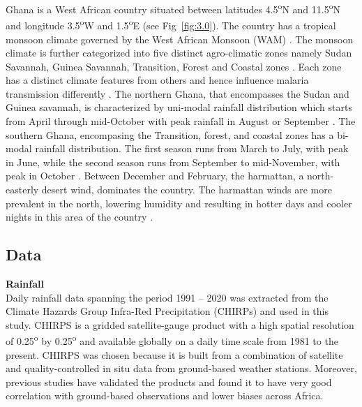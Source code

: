 \documentclass[utf8]{FrontiersinHarvard} %
\begin{document}
Ghana is a West African country situated between latitudes 4.5\textsuperscript{o}N and 11.5\textsuperscript{o}N and longitude 3.5\textsuperscript{o}W and 1.5\textsuperscript{o}E (see Fig~\ref{fig:3.0}). The country has a tropical monsoon climate governed by the West African Monsoon (WAM) \citep{ansah2020meteorological,aryee2018development}. The monsoon climate is further categorized into five distinct agro-climatic zones namely Sudan Savannah, Guinea Savannah, Transition, Forest and Coastal zones \citep{yamba2023revisiting}. Each zone has a distinct climate features from others and hence influence malaria transmission differently \citep{yamba2023climate}. The northern Ghana, that encompasses the Sudan and Guinea savannah, is characterized by uni-modal rainfall distribution which starts from April through mid-October with peak rainfall in August or September \citep{yamba2023revisiting}. The southern Ghana, encompasing the Transition, forest, and coastal zones has a bi-modal rainfall distribution. The first season runs from March to July, with peak in June, while the second season runs from September to mid-November, with peak in October \citep{yamba2023revisiting}. Between December and February, the harmattan, a north-easterly desert wind, dominates the country. The harmattan winds are more prevalent in the north, lowering humidity and resulting in hotter days and cooler nights in this area of the country \citep{aryee2018development}.

\subsection{Data}
\textbf{Rainfall}\\
\noindent Daily rainfall data spanning the period 1991 -- 2020 was extracted from the Climate Hazards Group Infra-Red Precipitation (CHIRPs) \citep{funk2015climate} and used in this study. CHIRPS is a gridded satellite-gauge product with a high spatial resolution of 0.25\textsuperscript{o} by 0.25\textsuperscript{o} and available globally on a daily time scale from 1981 to the present. CHIRPS was chosen because it is built from a combination of satellite and quality-controlled in situ data from ground-based weather stations. Moreover, previous studies \citep{gleixner2020did,parsons2022evaluation,verdin2020development} have validated the products and found it to have very good correlation with ground-based observations and lower biases across Africa. \\
\end{document}
